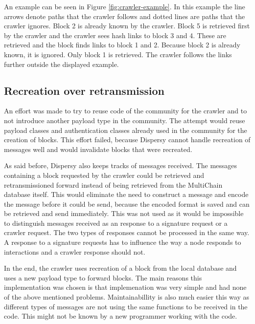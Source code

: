 An example can be seen in Figure \ref{fig:crawler-example}.
In this example the line arrows denote paths that the crawler follows
and dotted lines are paths that the crawler ignores.
Block 2 is already known by the crawler.
Block 5 is retrieved first by the crawler and the crawler sees hash links to block 3 and 4.
These are retrieved and the block finds links to block 1 and 2.
Because block 2 is already known, it is ignored.
Only block 1 is retrieved.
The crawler follows the links further outside the displayed example.

\subsection{Recreation over retransmission}
An effort was made to try to reuse code of the community for the crawler and to not introduce another payload type in the community.
The attempt would reuse payload classes and authentication classes already used in the community for the creation of blocks.
This effort failed, because Dispersy cannot handle recreation of messages well
and would invalidate blocks that were recreated.

As said before, Dispersy also keeps tracks of messages received.
The messages containing a block requested by the crawler could be retrieved and retransmissioned forward
instead of being retrieved from the MultiChain database itself.
This would eliminate the need to construct a message and encode the message before it could be send,
because the encoded format is saved and can be retrieved and send immediately.
This was not used as it would be impossible to distinguish messages received as an response to a signature request or a crawler request.
The two types of responses cannot be processed in the same way.
A response to a signature requests has to influence the way a node responds to interactions
and a crawler response should not.

In the end, the crawler uses recreation of a block from the local database and uses a new payload type to forward blocks.
The main reasons this implementation was chosen is
that implemenation was very simple and had none of the above mentioned problems.
Maintainabillity is also much easier this way
as different types of messages are not using the same functions to be received in the code.
This might not be known by a new programmer working with the code.

